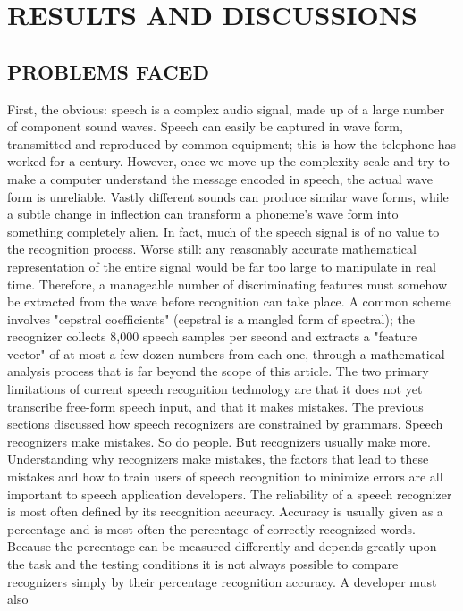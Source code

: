 \documentclass[11pt]{report} %
\begin{document}
\chapter{RESULTS AND DISCUSSIONS}

\section{PROBLEMS FACED}
\label{sec:PROBLEMS FACED}
First, the obvious: speech is a complex audio signal, made up of a large number of
component sound waves. Speech can easily be captured in wave form, transmitted and
reproduced by common equipment; this is how the telephone has worked for a century.
However, once we move up the complexity scale and try to make a computer understand
the message encoded in speech, the actual wave form is unreliable. Vastly different
sounds can produce similar wave forms, while a subtle change in inflection can transform
a phoneme's wave form into something completely alien. In fact, much of the speech
signal is of no value to the recognition process. Worse still: any reasonably accurate
mathematical representation of the entire signal would be far too large to manipulate in
real time.
Therefore, a manageable number of discriminating features must somehow be extracted
from the wave before recognition can take place. A common scheme involves "cepstral
coefficients" (cepstral is a mangled form of spectral); the recognizer collects 8,000
speech samples per second and extracts a "feature vector" of at most a few dozen
numbers from each one, through a mathematical analysis process that is far beyond the
scope of this article.
The two primary limitations of current speech recognition technology are that it does not
yet transcribe free-form speech input, and that it makes mistakes. The previous sections
discussed how speech recognizers are constrained by grammars. Speech recognizers
make mistakes. So do people. But recognizers usually make more. Understanding why
recognizers make mistakes, the factors that lead to these mistakes and how to train users
of speech recognition to minimize errors are all important to speech application
developers.
The reliability of a speech recognizer is most often defined by its recognition accuracy.
Accuracy is usually given as a percentage and is most often the percentage of correctly
recognized words. Because the percentage can be measured differently and depends
greatly upon the task and the testing conditions it is not always possible to compare
recognizers simply by their percentage recognition accuracy. A developer must also
\end{document}
